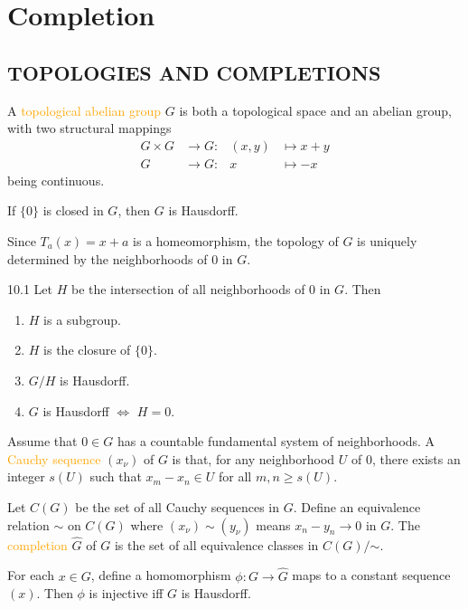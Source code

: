 \chapter{Completion}

\section*{TOPOLOGIES AND COMPLETIONS}
A \textcolor{orange}{topological abelian group} $G$ is both a topological space and an abelian group, with two structural mappings
\begin{equation*}
	\begin{aligned}
		G\times G&\rightarrow G:&(x,y)&\mapsto x+y\\
		G&\rightarrow G:&x&\mapsto-x
	\end{aligned}
\end{equation*}
being continuous.

If $\{0\}$ is closed in $G$, then $G$ is Hausdorff.

Since $T_a(x)=x+a$ is a homeomorphism, the topology of $G$ is uniquely determined by the neighborhoods of 0 in $G$.

\begin{proposition}{10.1}
	Let $H$ be the intersection of all neighborhoods of 0 in $G$. Then
	\begin{enumerate}[label=\textup{(\roman*)}]
		\item $H$ is a subgroup.
		\item $H$ is the closure of $\{0\}$.
		\item $G/H$ is Hausdorff.
		\item $G$ is Hausdorff $\Leftrightarrow$ $H=0$.
	\end{enumerate}
\end{proposition}

\begin{definition}
	Assume that $0\in G$ has a countable fundamental system of neighborhoods. A \textcolor{orange}{Cauchy sequence} $(x_\nu)$ of $G$ is that, for any neighborhood $U$ of 0, there exists an integer $s(U)$ such that $x_m-x_n\in U$ for all $m,n\geqslant s(U)$.

	Let $C(G)$ be the set of all Cauchy sequences in $G$. Define an equivalence relation $\sim$ on $C(G)$ where $(x_\nu)\sim(y_\nu)$ means $x_n-y_n\rightarrow0$ in $G$. The \textcolor{orange}{completion} $\hat{G}$ of $G$ is the set of all equivalence classes in $C(G)/\mathord{\sim}$.

	For each $x\in G$, define a homomorphism $\phi:G\rightarrow\hat{G}$ maps to a constant sequence $(x)$. Then $\phi$ is injective iff $G$ is Hausdorff.
\end{definition}

